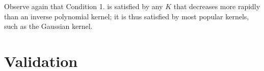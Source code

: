 Observe again that Condition 1. is satisfied by any $K$ that decreases more rapidly than an inverse polynomial kernel; it is thus satisfied by most popular kernels, such as the Gaussian kernel. 

\section{Validation}


